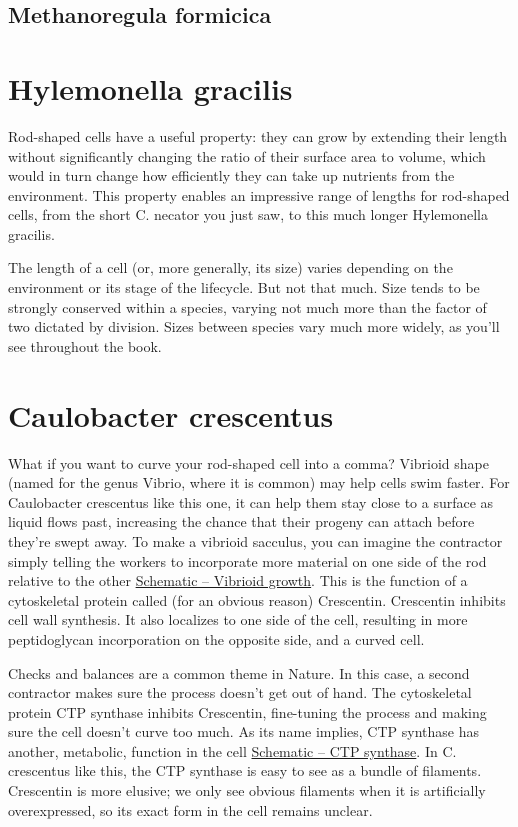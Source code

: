 \documentclass[]{tufte-book}
\begin{document}
\subsection{Methanoregula formicica}\label{Archaeal_rods}

\section{Hylemonella gracilis}\label{hylemonella-gracilis}

Rod-shaped cells have a useful property: they can grow by extending
their length without significantly changing the ratio of their surface
area to volume, which would in turn change how efficiently they can take
up nutrients from the environment. This property enables an impressive
range of lengths for rod-shaped cells, from the short C. necator you
just saw, to this much longer Hylemonella gracilis.

The length of a cell (or, more generally, its size) varies depending on
the environment or its stage of the lifecycle. But not that much. Size
tends to be strongly conserved within a species, varying not much more
than the factor of two dictated by division. Sizes between species vary
much more widely, as you'll see throughout the book.

\section{Caulobacter crescentus}\label{caulobacter-crescentus-1}

What if you want to curve your rod-shaped cell into a comma? Vibrioid
shape (named for the genus Vibrio, where it is common) may help cells
swim faster. For Caulobacter crescentus like this one, it can help them
stay close to a surface as liquid flows past, increasing the chance that
their progeny can attach before they're swept away. To make a vibrioid
sacculus, you can imagine the contractor simply telling the workers to
incorporate more material on one side of the rod relative to the other
\protect\hyperlink{Vibrioid_growth}{Schematic -- Vibrioid growth}. This
is the function of a cytoskeletal protein called (for an obvious reason)
Crescentin. Crescentin inhibits cell wall synthesis. It also localizes
to one side of the cell, resulting in more peptidoglycan incorporation
on the opposite side, and a curved cell.

Checks and balances are a common theme in Nature. In this case, a second
contractor makes sure the process doesn't get out of hand. The
cytoskeletal protein CTP synthase inhibits Crescentin, fine-tuning the
process and making sure the cell doesn't curve too much. As its name
implies, CTP synthase has another, metabolic, function in the cell
\protect\hyperlink{CTP_synthase}{Schematic -- CTP synthase}. In C.
crescentus like this, the CTP synthase is easy to see as a bundle of
filaments. Crescentin is more elusive; we only see obvious filaments
when it is artificially overexpressed, so its exact form in the cell
remains unclear.
\end{document}
